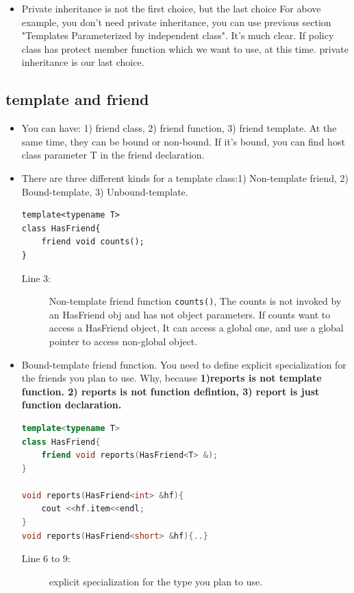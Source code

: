 \documentclass[a4paper,11pt,twoside]{book}
\begin{document}
\begin{itemize}
    \item Private inheritance is not the first choice, but the last choice For above example, you don't need private inheritance, you can use previous section "Templates Parameterized by independent class". It's much clear. If policy class has protect member function which we want to use, at this time. private inheritance is our last choice. 

\end{itemize}

\subsection{template and friend}
\begin{itemize}
	\item You can have: 1) friend class, 2) friend function, 3) friend template. At the same time, they can be bound or non-bound. If it's bound, you can find host class parameter T in the friend declaration. 
	
	\item  There are three different kinds for a template class:1) Non-template friend, 2) Bound-template, 3) Unbound-template.


\begin{lstlisting}
template<typename T>
class HasFriend{
	friend void counts();
}
\end{lstlisting}
\begin{description}
	\item[Line 3:] Non-template friend function \texttt{counts()}, The counts is not invoked by an HasFriend obj and has not object parameters.  If counts want to access a HasFriend object, It can access a global one, and use a global pointer to access non-global object.
\end{description}
	
	\item Bound-template friend function. You need to define explicit specialization for the friends you plan to use. Why, because \textbf{1)reports is not template function. 2) reports is not function defintion, 3) report is just function declaration.}
	
\begin{lstlisting}[frame=single, language=c++]
template<typename T>
class HasFriend{
	friend void reports(HasFriend<T> &);
}
	
void reports(HasFriend<int> &hf){
	cout <<hf.item<<endl;
}
void reports(HasFriend<short> &hf){..}
\end{lstlisting}
\begin{description}
	\item[Line 6 to 9:] explicit specialization for the type you plan to use.
\end{description}
	

\end{itemize}
\end{document}
